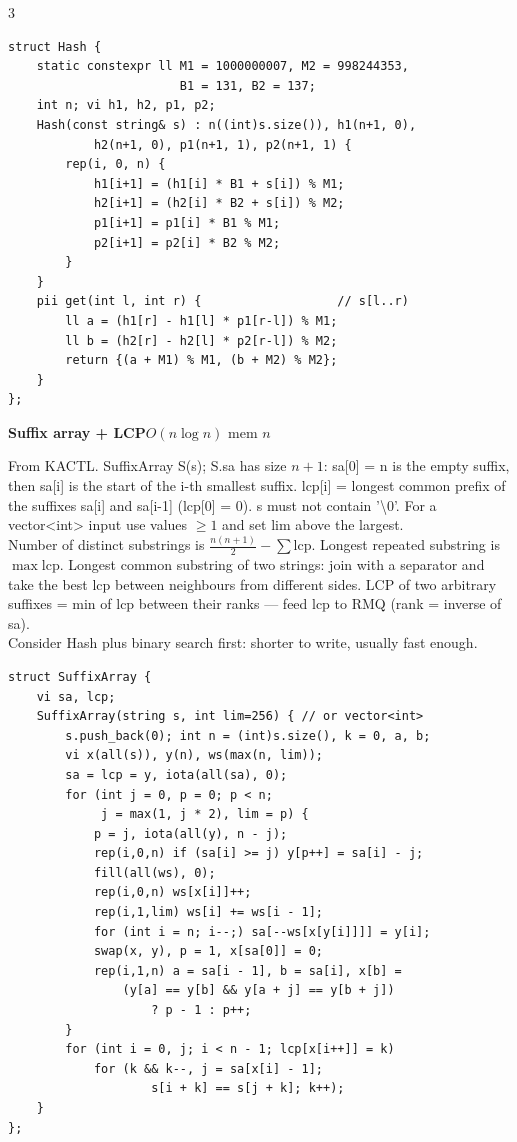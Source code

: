 \documentclass[9pt,a4paper]{extarticle}
\newcommand{\entry}[3]{%
  \addcontentsline{toc}{subsection}{#1}%
  \vspace{0.8ex}%
  \noindent\colorbox{hdbg}{\parbox{\dimexpr\columnwidth-2\fboxsep}{%
    \strut\textbf{#1}\hfill{\footnotesize\textsf{#2}}}}\par
  \vspace{0.4ex}%
  {\footnotesize #3\par}%
}
\newcommand{\code}[1]{{\ttfamily\small #1}}
\begin{document}
\begin{multicols*}{3}
\begin{lstlisting}
struct Hash {
    static constexpr ll M1 = 1000000007, M2 = 998244353,
                        B1 = 131, B2 = 137;
    int n; vi h1, h2, p1, p2;
    Hash(const string& s) : n((int)s.size()), h1(n+1, 0),
            h2(n+1, 0), p1(n+1, 1), p2(n+1, 1) {
        rep(i, 0, n) {
            h1[i+1] = (h1[i] * B1 + s[i]) % M1;
            h2[i+1] = (h2[i] * B2 + s[i]) % M2;
            p1[i+1] = p1[i] * B1 % M1;
            p2[i+1] = p2[i] * B2 % M2;
        }
    }
    pii get(int l, int r) {                   // s[l..r)
        ll a = (h1[r] - h1[l] * p1[r-l]) % M1;
        ll b = (h2[r] - h2[l] * p2[r-l]) % M2;
        return {(a + M1) % M1, (b + M2) % M2};
    }
};
\end{lstlisting}

\entry{Suffix array + LCP}{$O(n \log n)$ \quad mem $n$}{%
From KACTL. \code{SuffixArray S(s);} \code{S.sa} has size $n+1$: \code{sa[0] = n} is
the empty suffix, then \code{sa[i]} is the start of the \code{i}-th smallest suffix.
\code{lcp[i]} = longest common prefix of the suffixes \code{sa[i]} and \code{sa[i-1]}
(\code{lcp[0] = 0}). \code{s} must not contain \code{'\textbackslash0'}. For a
\code{vector<int>} input use values $\ge 1$ and set \code{lim} above the
largest.\\[0.3ex]
Number of distinct substrings is $\frac{n(n+1)}{2} - \sum \mathrm{lcp}$. Longest
repeated substring is $\max \mathrm{lcp}$. Longest common substring of two strings: join
with a separator and take the best \code{lcp} between neighbours from different sides.
LCP of two arbitrary suffixes = min of \code{lcp} between their ranks --- feed
\code{lcp} to \code{RMQ} (rank = inverse of \code{sa}).\\[0.3ex]
Consider \code{Hash} plus binary search first: shorter to write, usually fast enough.}

\begin{lstlisting}
struct SuffixArray {
    vi sa, lcp;
    SuffixArray(string s, int lim=256) { // or vector<int>
        s.push_back(0); int n = (int)s.size(), k = 0, a, b;
        vi x(all(s)), y(n), ws(max(n, lim));
        sa = lcp = y, iota(all(sa), 0);
        for (int j = 0, p = 0; p < n;
             j = max(1, j * 2), lim = p) {
            p = j, iota(all(y), n - j);
            rep(i,0,n) if (sa[i] >= j) y[p++] = sa[i] - j;
            fill(all(ws), 0);
            rep(i,0,n) ws[x[i]]++;
            rep(i,1,lim) ws[i] += ws[i - 1];
            for (int i = n; i--;) sa[--ws[x[y[i]]]] = y[i];
            swap(x, y), p = 1, x[sa[0]] = 0;
            rep(i,1,n) a = sa[i - 1], b = sa[i], x[b] =
                (y[a] == y[b] && y[a + j] == y[b + j])
                    ? p - 1 : p++;
        }
        for (int i = 0, j; i < n - 1; lcp[x[i++]] = k)
            for (k && k--, j = sa[x[i] - 1];
                    s[i + k] == s[j + k]; k++);
    }
};
\end{lstlisting}


\end{multicols*}
\end{document}
